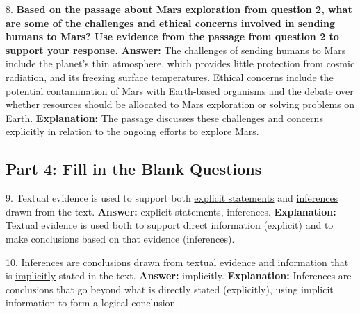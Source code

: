 \documentclass[12pt]{article}
\begin{document}
\vspace{1cm}
8. \textbf{Based on the passage about Mars exploration from question 2, what are some of the challenges and ethical concerns involved in sending humans to Mars? Use evidence from the passage from question 2 to support your response.}  
\textbf{Answer:} The challenges of sending humans to Mars include the planet’s thin atmosphere, which provides little protection from cosmic radiation, and its freezing surface temperatures. Ethical concerns include the potential contamination of Mars with Earth-based organisms and the debate over whether resources should be allocated to Mars exploration or solving problems on Earth.  
\textbf{Explanation:} The passage discusses these challenges and concerns explicitly in relation to the ongoing efforts to explore Mars.

\subsection*{Part 4: Fill in the Blank Questions}

9. Textual evidence is used to support both \underline{explicit statements} and \underline{inferences} drawn from the text.  
\textbf{Answer:} explicit statements, inferences.  
\textbf{Explanation:} Textual evidence is used both to support direct information (explicit) and to make conclusions based on that evidence (inferences).

10. Inferences are conclusions drawn from textual evidence and information that is \underline{implicitly} stated in the text.  
\textbf{Answer:} implicitly.  
\textbf{Explanation:} Inferences are conclusions that go beyond what is directly stated (explicitly), using implicit information to form a logical conclusion.
\end{document}
